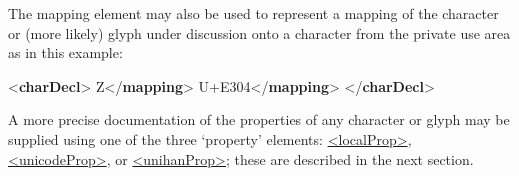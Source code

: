 The mapping element may also be used to represent a mapping of the character or (more likely) glyph under discussion onto a character from the private use area as in this example: \par\bgroup{}\exampleFont \begin{shaded}\noindent\mbox{}{<\textbf{charDecl}>}\mbox{}\newline 
{}\mbox{}\newline 
\hspace*{1em}\mbox{}\newline 
\hspace*{1em}Z{</\textbf{mapping}>}\mbox{}\newline 
\hspace*{1em}U+E304{</\textbf{mapping}>}\mbox{}\newline 
{}\mbox{}\newline 
{</\textbf{charDecl}>}\end{shaded}\egroup\par \par
A more precise documentation of the properties of any character or glyph may be supplied using one of the three ‘property’ elements: \hyperref[TEI.localProp]{<localProp>}, \hyperref[TEI.unicodeProp]{<unicodeProp>}, or \hyperref[TEI.unihanProp]{<unihanProp>}; these are described in the next section.

